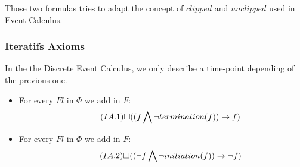 Those two formulas tries to adapt the concept of $clipped$ and $unclipped$ used in Event Calculus.

\subsubsection{Iteratifs Axioms}

In the the Discrete Event Calculus, we only describe a time-point depending of the previous one.

\begin{itemize}
  \item
    For every $Fl$ in $\Phi$ we add in $F$:
    \begin{equation}\tag{$IA.1$}
      \square((f \bigwedge \neg termination(f)) \rightarrow f)
    \end{equation}
  \item
    For every $Fl$ in $\Phi$ we add in $F$:
    \begin{equation}\tag{$IA.2$}
      \square((\neg f \bigwedge \neg initiation(f)) \rightarrow \neg f)
    \end{equation}
\end{itemize}

